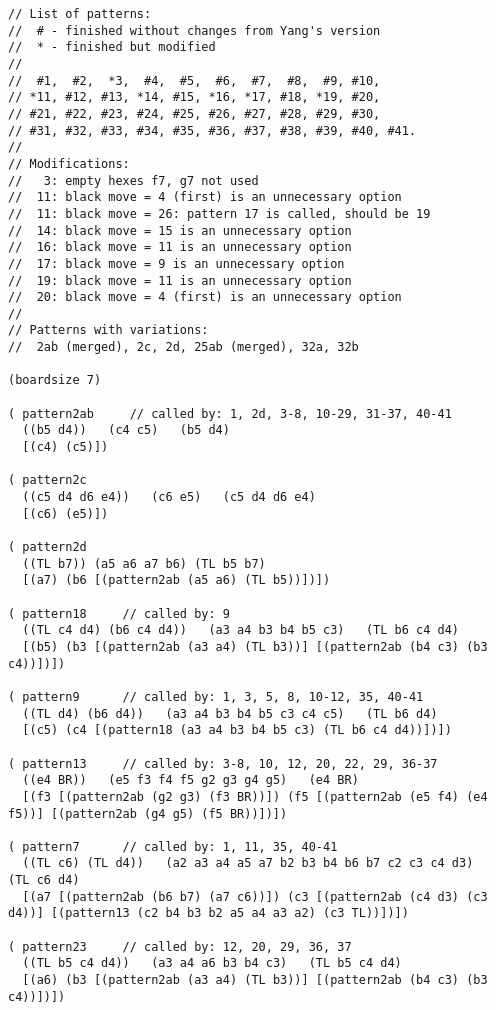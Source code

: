 {\scriptsize\bf
\begin{verbatim}
// List of patterns:
//  # - finished without changes from Yang's version
//  * - finished but modified
//
//  #1,  #2,  *3,  #4,  #5,  #6,  #7,  #8,  #9, #10,
// *11, #12, #13, *14, #15, *16, *17, #18, *19, #20,
// #21, #22, #23, #24, #25, #26, #27, #28, #29, #30,
// #31, #32, #33, #34, #35, #36, #37, #38, #39, #40, #41.
//
// Modifications:
//   3: empty hexes f7, g7 not used
//  11: black move = 4 (first) is an unnecessary option
//  11: black move = 26: pattern 17 is called, should be 19
//  14: black move = 15 is an unnecessary option
//  16: black move = 11 is an unnecessary option
//  17: black move = 9 is an unnecessary option
//  19: black move = 11 is an unnecessary option
//  20: black move = 4 (first) is an unnecessary option
//
// Patterns with variations:
//  2ab (merged), 2c, 2d, 25ab (merged), 32a, 32b

(boardsize 7)

( pattern2ab     // called by: 1, 2d, 3-8, 10-29, 31-37, 40-41
  ((b5 d4))   (c4 c5)   (b5 d4)
  [(c4) (c5)])

( pattern2c
  ((c5 d4 d6 e4))   (c6 e5)   (c5 d4 d6 e4)
  [(c6) (e5)])

( pattern2d
  ((TL b7)) (a5 a6 a7 b6) (TL b5 b7)
  [(a7) (b6 [(pattern2ab (a5 a6) (TL b5))])])

( pattern18     // called by: 9
  ((TL c4 d4) (b6 c4 d4))   (a3 a4 b3 b4 b5 c3)   (TL b6 c4 d4)
  [(b5) (b3 [(pattern2ab (a3 a4) (TL b3))] [(pattern2ab (b4 c3) (b3 c4))])])

( pattern9      // called by: 1, 3, 5, 8, 10-12, 35, 40-41
  ((TL d4) (b6 d4))   (a3 a4 b3 b4 b5 c3 c4 c5)   (TL b6 d4)
  [(c5) (c4 [(pattern18 (a3 a4 b3 b4 b5 c3) (TL b6 c4 d4))])])

( pattern13     // called by: 3-8, 10, 12, 20, 22, 29, 36-37
  ((e4 BR))   (e5 f3 f4 f5 g2 g3 g4 g5)   (e4 BR)
  [(f3 [(pattern2ab (g2 g3) (f3 BR))]) (f5 [(pattern2ab (e5 f4) (e4 f5))] [(pattern2ab (g4 g5) (f5 BR))])])

( pattern7      // called by: 1, 11, 35, 40-41
  ((TL c6) (TL d4))   (a2 a3 a4 a5 a7 b2 b3 b4 b6 b7 c2 c3 c4 d3)   (TL c6 d4)
  [(a7 [(pattern2ab (b6 b7) (a7 c6))]) (c3 [(pattern2ab (c4 d3) (c3 d4))] [(pattern13 (c2 b4 b3 b2 a5 a4 a3 a2) (c3 TL))])])

( pattern23     // called by: 12, 20, 29, 36, 37
  ((TL b5 c4 d4))   (a3 a4 a6 b3 b4 c3)   (TL b5 c4 d4)
  [(a6) (b3 [(pattern2ab (a3 a4) (TL b3))] [(pattern2ab (b4 c3) (b3 c4))])])


\end{verbatim}}
